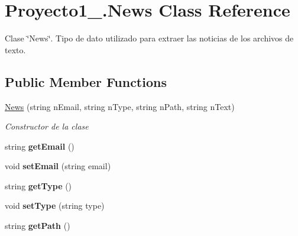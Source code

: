 \hypertarget{class_proyecto1__1096917_1_1_news}{}\section{Proyecto1\+\_.\+News Class Reference}
\label{class_proyecto1__1096917_1_1_news}


Clase \char`\"{}\+News\char`\"{}. Tipo de dato utilizado para extraer las noticias de los archivos de texto.  


\subsection*{Public Member Functions}
\begin{DoxyCompactItemize}
\item 
\mbox{\hyperlink{class_proyecto1__1096917_1_1_news_a137a8d0b1d8d226db2895518c7cba0a6}{News}} (string n\+Email, string n\+Type, string n\+Path, string n\+Text)
\begin{DoxyCompactList}\small\item\em Constructor de la clase \end{DoxyCompactList}\item 
\mbox{\label{class_proyecto1__1096917_1_1_news_a336c0d1976a3b83c7d2b7594cb7ba53b}} 
string {\bfseries get\+Email} ()
\item 
\mbox{\label{class_proyecto1__1096917_1_1_news_a915251303797bbb3a893411085c2a1c1}} 
void {\bfseries set\+Email} (string email)
\item 
\mbox{\label{class_proyecto1__1096917_1_1_news_a9a87c0f6c4245b3ef056c2d01e5dba86}} 
string {\bfseries get\+Type} ()
\item 
\mbox{\label{class_proyecto1__1096917_1_1_news_afb7d48a37581ac43e007b9e572ecb749}} 
void {\bfseries set\+Type} (string type)
\item 
\mbox{\label{class_proyecto1__1096917_1_1_news_ad698885a7e98e6becf54d4a3c322e38b}} 
string {\bfseries get\+Path} ()
\item 
\mbox{\label{class_proyecto1__1096917_1_1_news_abcbcb5da2840dadc8e60e6eeccebd286}} 

\end{DoxyCompactItemize}
